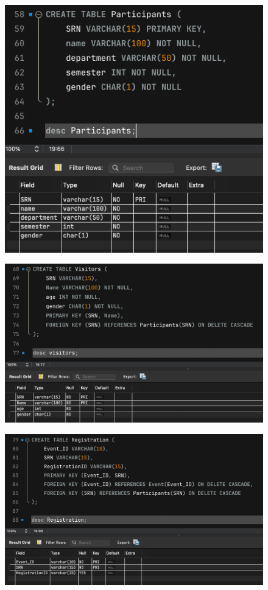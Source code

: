 \documentclass{article}
\begin{document}
\begin{figure}[H]
    \centering
    \includegraphics[width=0.7\linewidth]{images/task 1/7.png}
\end{figure}

\begin{figure}[H]
    \centering
    \includegraphics[width=0.7\linewidth]{images/task 1/8.png}
\end{figure}

\begin{figure}[H]
    \centering
    \includegraphics[width=0.7\linewidth]{images/task 1/9.png}
\end{figure}
\end{document}
